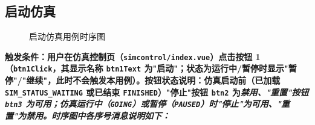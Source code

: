 \subsection{启动仿真}
\begin{figure}[!h]
	\centering
	\resizebox{1.0\linewidth}{!}{}
	\caption{启动仿真用例时序图}\label{fig:runModel}
\end{figure}
\bf{触发条件}：用户在仿真控制页（\texttt{simcontrol/index.vue}）点击按钮 1（\texttt{btn1Click}，其显示名称 \texttt{btn1Text} 为"启动"；状态为运行中/暂停时显示"暂停"/"继续"，此时不会触发本用例）。\bf{按钮状态说明}：仿真启动前（已加载 \texttt{SIM\_STATUS\_WAITING} 或已结束 \texttt{FINISHED}）"停止"按钮 \texttt{btn2} 为\it{禁用}、"重置"按钮 \texttt{btn3} 为\it{可用}；仿真运行中（\texttt{GOING}）或暂停（\texttt{PAUSED}）时"停止"为\it{可用}、"重置"为\it{禁用}。时序图中各序号消息说明如下：
